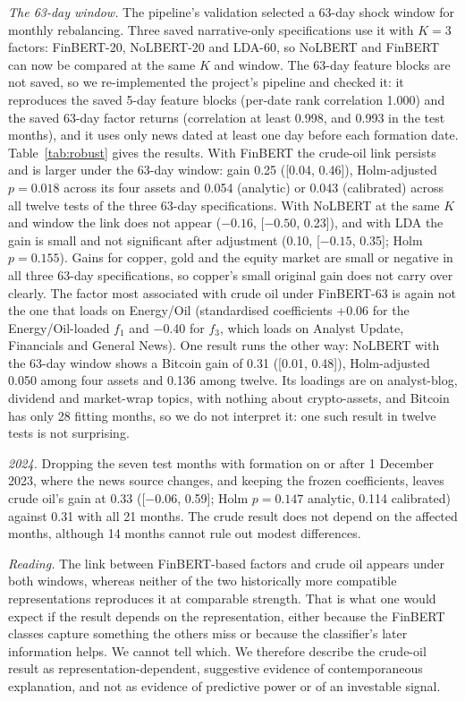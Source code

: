 \documentclass[11pt]{article}
\begin{document}
\emph{The 63-day window.} The pipeline's validation selected a 63-day shock window for monthly rebalancing. Three saved narrative-only specifications use it with $K=3$ factors: FinBERT-20, NoLBERT-20 and LDA-60, so NoLBERT and FinBERT can now be compared at the same $K$ and window. The 63-day feature blocks are not saved, so we re-implemented the project's pipeline and checked it: it reproduces the saved 5-day feature blocks (per-date rank correlation 1.000) and the saved 63-day factor returns (correlation at least 0.998, and 0.993 in the test months), and it uses only news dated at least one day before each formation date. Table~\ref{tab:robust} gives the results. With FinBERT the crude-oil link persists and is larger under the 63-day window: gain 0.25 ([0.04, 0.46]), Holm-adjusted $p=0.018$ across its four assets and 0.054 (analytic) or 0.043 (calibrated) across all twelve tests of the three 63-day specifications. With NoLBERT at the same $K$ and window the link does not appear ($-0.16$, [$-0.50$, 0.23]), and with LDA the gain is small and not significant after adjustment (0.10, [$-0.15$, 0.35]; Holm $p=0.155$). Gains for copper, gold and the equity market are small or negative in all three 63-day specifications, so copper's small original gain does not carry over clearly. The factor most associated with crude oil under FinBERT-63 is again not the one that loads on Energy/Oil (standardised coefficients +0.06 for the Energy/Oil-loaded $f_1$ and $-$0.40 for $f_3$, which loads on Analyst Update, Financials and General News). One result runs the other way: NoLBERT with the 63-day window shows a Bitcoin gain of 0.31 ([0.01, 0.48]), Holm-adjusted 0.050 among four assets and 0.136 among twelve. Its loadings are on analyst-blog, dividend and market-wrap topics, with nothing about crypto-assets, and Bitcoin has only 28 fitting months, so we do not interpret it: one such result in twelve tests is not surprising.

\emph{2024.} Dropping the seven test months with formation on or after 1 December 2023, where the news source changes, and keeping the frozen coefficients, leaves crude oil's gain at 0.33 ([$-0.06$, 0.59]; Holm $p=0.147$ analytic, 0.114 calibrated) against 0.31 with all 21 months. The crude result does not depend on the affected months, although 14 months cannot rule out modest differences.

\emph{Reading.} The link between FinBERT-based factors and crude oil appears under both windows, whereas neither of the two historically more compatible representations reproduces it at comparable strength. That is what one would expect if the result depends on the representation, either because the FinBERT classes capture something the others miss or because the classifier's later information helps. We cannot tell which. We therefore describe the crude-oil result as representation-dependent, suggestive evidence of contemporaneous explanation, and not as evidence of predictive power or of an investable signal.
\end{document}
